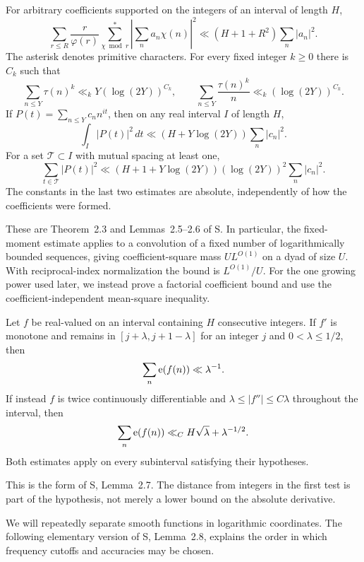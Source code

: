 \begin{proposition}\label{pre:moments}
For arbitrary coefficients supported on the integers of an interval
of length $H$,
\[
 \sum_{r\le R}\frac r{\varphi(r)}
 \sum_{\chi\bmod r}^{*}
 \left|\sum_n a_n\chi(n)\right|^2
 \ll (H+1+R^2)\sum_n|a_n|^2.
\]
The asterisk denotes primitive characters. For every fixed integer
$k\ge0$ there is $C_k$ such that
\[
 \sum_{n\le Y}\tau(n)^k\ll_k Y(\log(2Y))^{C_k},\qquad
 \sum_{n\le Y}\frac{\tau(n)^k}{n}
 \ll_k(\log(2Y))^{C_k}.
\]
If $P(t)=\sum_{n\le Y}c_n n^{it}$, then on any real interval $I$
of length $H$,
\[
 \int_I|P(t)|^2\,dt
 \ll (H+Y\log(2Y))\sum_n|c_n|^2.
\]
For a set $\mathcal T\subset I$ with mutual spacing at least one,
\[
 \sum_{t\in\mathcal T}|P(t)|^2
 \ll (H+1+Y\log(2Y))(\log(2Y))^2\sum_n|c_n|^2.
\]
The constants in the last two estimates are absolute, independently
of how the coefficients were formed.
\end{proposition}

These are Theorem~2.3 and Lemmas~2.5--2.6 of S. In particular, the
fixed-moment estimate applies to a convolution of a fixed number of
logarithmically bounded sequences, giving coefficient-square mass
$UL^{O(1)}$ on a dyad of size $U$. With reciprocal-index
normalization the bound is $L^{O(1)}/U$. For the one growing power
used later, we instead prove a factorial coefficient bound and use
the coefficient-independent mean-square inequality.

\begin{proposition}\label{pre:derivatives}
Let $f$ be real-valued on an interval containing $H$ consecutive
integers. If $f'$ is monotone and remains in
$[j+\lambda,j+1-\lambda]$ for an integer $j$ and
$0<\lambda\le1/2$, then
\[
 \sum_n\mathrm{e}(f(n))\ll\lambda^{-1}.
\]
If instead $f$ is twice continuously differentiable and
$\lambda\le|f''|\le C\lambda$ throughout the interval, then
\[
 \sum_n\mathrm{e}(f(n))\ll_C H\sqrt\lambda+\lambda^{-1/2}.
\]
Both estimates apply on every subinterval satisfying their hypotheses.
\end{proposition}

This is the form of S, Lemma~2.7. The distance from integers in the
first test is part of the hypothesis, not merely a lower bound on
the absolute derivative.

We will repeatedly separate smooth functions in logarithmic
coordinates. The following elementary version of S, Lemma~2.8,
explains the order in which frequency cutoffs and accuracies may be
chosen.

